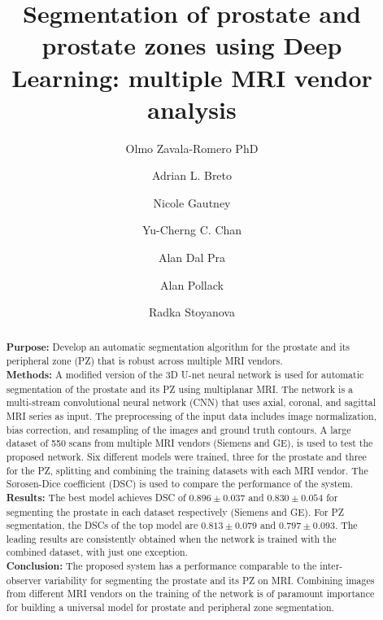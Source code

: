 \documentclass[num-refs]{wiley-article}
\title{ Segmentation of prostate and prostate zones using Deep Learning: multiple MRI vendor analysis }
\author[1]{Olmo Zavala-Romero PhD}
\author[1]{Adrian L. Breto }
\author[1]{Nicole Gautney}
\author[1]{Yu-Cherng C. Chan}
\author[1]{Alan Dal Pra}
\author[1]{Alan Pollack}
\author[1]{Radka Stoyanova}
\affil[1]{Radiation Oncology, University of Miami Miller School of Medicine,
                Miami, FL, 33136, USA}
\begin{document}
\maketitle

\begin{abstract} %
\small{
\textbf{Purpose:} Develop an automatic segmentation algorithm for the prostate and its peripheral zone (PZ) that
is robust across multiple MRI vendors. \\
\textbf{Methods:} A modified version of the 3D U-net neural network is used for automatic segmentation of the prostate and its PZ using multiplanar MRI. The network is a multi-stream convolutional neural network (CNN) that uses axial, coronal, and sagittal MRI series as input. The preprocessing of the input data includes image normalization, bias correction, and resampling of the images and ground truth contours. A large dataset of 550 scans from multiple MRI vendors (Siemens and GE), is used to test the proposed network. Six different models were trained, three for the prostate and three for the PZ, splitting and combining the training datasets with each MRI vendor. The S\o rosen-Dice coefficient (DSC) is used to compare the performance of the system. \\
\textbf{Results:} The best model achieves DSC of $0.896 \pm 0.037$ and  $0.830 \pm 0.054$ for segmenting the prostate in each dataset respectively (Siemens and GE). For PZ segmentation, the DSCs of the top model are $0.813 \pm 0.079$ and $0.797 \pm 0.093$. The leading results are consistently obtained when the network is trained with the combined dataset, with just one exception. \\
\textbf{Conclusion:} The proposed system has a performance comparable to the inter-observer variability for segmenting the prostate and its PZ on MRI. Combining images from different MRI vendors on the training of the network is of paramount importance for building a universal model for prostate and peripheral zone segmentation. 

}
\end{abstract}
\end{document}
